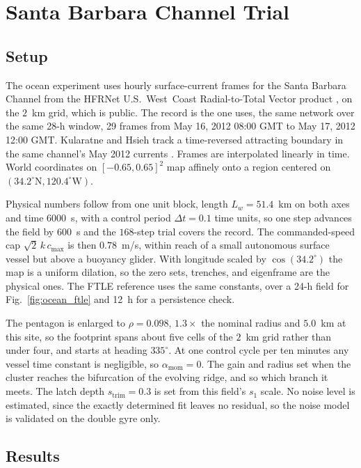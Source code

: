 \documentclass[lettersize,journal]{IEEEtran}
\begin{document}
\section{Santa Barbara Channel Trial}
\label{sec:ocean}

\subsection{Setup}
\label{sec:ocean_sim}

The ocean experiment uses hourly surface-current frames for the Santa
Barbara Channel from the HFRNet U.S.~West~Coast Radial-to-Total Vector
product \cite{34}, on the $2$~km grid, which is public. The record is the one \cite{26} uses, the same network over the same 28-h window, 29 frames from May 16, 2012 08:00 GMT to May 17, 2012 12:00 GMT. Kularatne and Hsieh track a time-reversed attracting boundary in the same channel's May 2012 currents \cite{29}.
Frames are interpolated linearly in time. World
coordinates on $[-0.65, 0.65]^2$ map affinely onto a region centered on
$(34.2^{\circ}\mathrm{N}, 120.4^{\circ}\mathrm{W})$.

Physical numbers follow from one unit block, length $L_w = 51.4$~km on
both axes and time $6000$~s, with a control period $\Delta t = 0.1$
time units, so one step advances the field by $600$~s and the
$168$-step trial covers the record. The commanded-speed cap
$\sqrt{2}\,k\,c_{\max}$ is then $0.78$~m/s, within reach of a small
autonomous surface vessel but above a buoyancy glider. With longitude
scaled by $\cos(34.2^{\circ})$ the map is a uniform dilation, so the zero
sets, trenches, and eigenframe are the physical ones. The FTLE reference
uses the same constants, over a 24-h field for Fig.~\ref{fig:ocean_ftle}
and 12~h for a persistence check.

The pentagon is enlarged to $\rho = 0.098$, $1.3\times$ the nominal radius
and $5.0$~km at this site, so the footprint spans about five cells of the
$2$~km grid rather than under four, and starts at heading $335^\circ$. At
one control cycle per ten minutes any vessel time constant is negligible,
so $\alpha_{\text{mom}} = 0$. The gain and radius set when the cluster
reaches the bifurcation of the evolving ridge, and so which branch it
meets. The latch depth $s_{\mathrm{trim}} = 0.3$ is set from this field's
$s_1$ scale. No
noise level is estimated, since the exactly determined fit leaves no
residual, so the noise model is validated on the double gyre only.

\subsection{Results}
\label{sec:disc_ocean}
\end{document}
